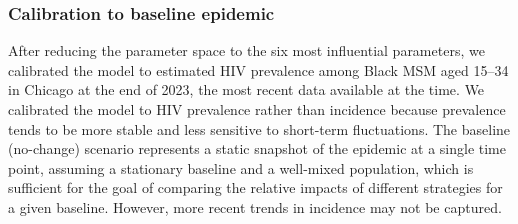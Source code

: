 \documentclass[preprint,12pt]{elsarticle}
\begin{document}


\subsubsection{Calibration to baseline epidemic}

After reducing the parameter space to the six most influential parameters, we calibrated the model to estimated HIV prevalence among Black MSM aged 15--34 in Chicago at the end of 2023, the most recent data available at the time. \cite{idph_msm_plwhiv_chicago_2024} We calibrated the model to HIV prevalence rather than incidence because prevalence tends to be more stable and less sensitive to short-term fluctuations. The baseline (no-change) scenario represents a static snapshot of the epidemic at a single time point, assuming a stationary baseline and a well-mixed population, which is sufficient for the goal of comparing the relative impacts of different strategies for a given baseline. However, more recent trends in incidence may not be captured.
\end{document}
